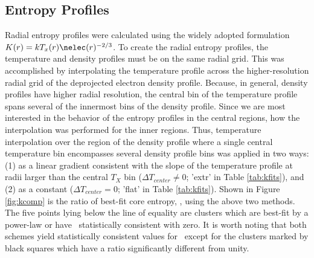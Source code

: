\subsection{Entropy Profiles}
\label{sec:entsuppkpr}

Radial entropy profiles were calculated using the widely adopted
formulation $K(r) = kT_x(r)\nelec(r)^{-2/3}$. To create the radial
entropy profiles, the temperature and density profiles must be on the
same radial grid. This was accomplished by interpolating the
temperature profile across the higher-resolution radial grid of the
deprojected electron density profile. Because, in general, density
profiles have higher radial resolution, the central bin of the
temperature profile spans several of the innermost bins of the density
profile. Since we are most interested in the behavior of the entropy
profiles in the central regions, how the interpolation was performed
for the inner regions. Thus, temperature interpolation over the region
of the density profile where a single central temperature bin
encompasses several density profile bins was applied in two ways: (1)
as a linear gradient consistent with the slope of the temperature
profile at radii larger than the central $T_X$ bin ($\Delta T_{center}
\ne 0$; 'extr' in Table \ref{tab:kfits}), and (2) as a constant
($\Delta T_{center}=0$; 'flat' in Table \ref{tab:kfits}). Shown in
Figure \ref{fig:kcomp} is the ratio of best-fit core entropy, \kna,
using the above two methods. The five points lying below the line of
equality are clusters which are best-fit by a power-law or have
\kna\ statistically consistent with zero. It is worth noting that both
schemes yield statistically consistent values for \kna\ except for the
clusters marked by black squares which have a ratio significantly
different from unity.

